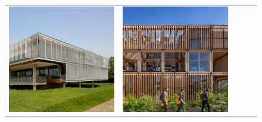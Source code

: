 \begin{figure}[H]
{\begin{tabular}{@{}ccccc@{}}
      \includegraphics[width=\linewidth]{Images/LoRAs/Modulariteit/Training_images/3.jpeg} &
      \includegraphics[width=\linewidth]{Images/LoRAs/Modulariteit/Training_images/4.jpg} &

\end{tabular}}
\end{figure}
